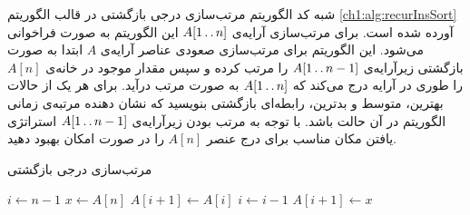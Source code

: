 { شبه کد الگوریتم مرتب‌سازی درجی بازگشتی در قالب الگوریتم {\eqref{ch1:alg:recurInsSort}} آورده شده است. برای مرتب‌سازی آرایه‌ی  {$A[1\mathinner{\ldotp\ldotp} n]$} این الگوریتم به صورت {} فراخوانی می‌شود. این الگوریتم برای مرتب‌سازی صعودی عناصر آرایه‌ی {$A$} ابتدا به صورت بازگشتی زیرآرایه‌ی {$A[1\mathinner{\ldotp\ldotp} n-1]$} را مرتب کرده و سپس مقدار موجود در خانه‌ی {$A[n]$} را طوری در آرایه درج می‌کند که {$A[1\mathinner{\ldotp\ldotp} n]$} به صورت مرتب درآید. برای هر یک از حالات بهترین، متوسط و بدترین، رابطه‌ای بازگشتی بنویسید که نشان دهنده مرتبه‌ی زمانی الگوریتم در آن حالت باشد. با توجه به مرتب بودن زیرآرایه‌ی {$A[1\mathinner{\ldotp\ldotp} n-1]$} استراتژی یافتن مکان مناسب برای درج عنصر {$A[n]$} را در صورت امکان بهبود دهید.

\begin{algorithm}
\caption{مرتب‌سازی درجی بازگشتی}\label{ch1:alg:recurInsSort}
\begin{latin}
\begin{algorithmic}[1]
				\State	\Return
		\Else
				\State	{}
				\State	$i \gets n-1$\label{ch1:alg:line:recInsSrtAftCall}
				\State	$x \gets A[n]$
						\State	$A[i+1] \gets A[i]$
						\State	$i \gets i-1$
				\EndWhile
				\State	$A[i+1] \gets x$	\label{ch1:alg:line:recInsSrtIns}
		\EndIf
\EndProcedure
\end{algorithmic}
\end{latin}
\end{algorithm}


}
